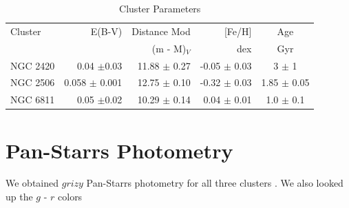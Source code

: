 \documentclass{aastex6}
\newcommand{\DHSresApprox}{300}
\begin{document}
\begin{table}
\centering
\caption{Cluster Parameters}\label{tab:clusterProp}
\begin{tabular}{lrrrc}
\hline \hline
Cluster   					&  E(B-V) 			& Distance Mod 	& [Fe/H] 			& Age \\
          					&     				&    (m - M)$_V$	& 	dex 			& Gyr \\
\hline \hline
NGC 2420\tablenotemark{a}	& 0.04 $\pm$0.03	&  11.88 $\pm$ 0.27	& -0.05 $\pm$ 0.03	& 3 $\pm$ 1 \\
NGC 2506\tablenotemark{b}	& 0.058 $\pm$ 0.001	&  12.75 $\pm$ 0.10 	& -0.32 $\pm$ 0.03	& 1.85 $\pm$ 0.05 \\
NGC 6811\tablenotemark{c}	& 0.05 $\pm$0.02	& 10.29 $\pm$ 0.14	& 0.04 $\pm$ 0.01 	& 1.0 $\pm$ 0.1 \\
\hline
\end{tabular}
\end{table}


\section{Pan-Starrs Photometry}

We obtained $grizy$ Pan-Starrs photometry for all three clusters \citep{magnier2013photLadder,schlafly2012photcal,tonry2012panstarrsPhot}.
We also looked up the $g$ - $r$ colors
\end{document}

